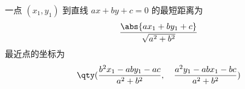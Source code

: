 
\begin{issues}
\issueDraft
\end{issues}

一点 $(x_1,y_1)$ 到直线 $ax + by + c = 0$ 的最短距离为
\begin{equation}
\frac{\abs{ax_1 + by_1 + c}}{\sqrt{a^2 + b^2}}
\end{equation}
最近点的坐标为
\begin{equation}
\qty(
\frac{b^2x_1 - aby_1 - ac}{a^2 + b^2}, \quad
\frac{a^2y_1 - abx_1 - bc}{a^2 + b^2})
\end{equation}


